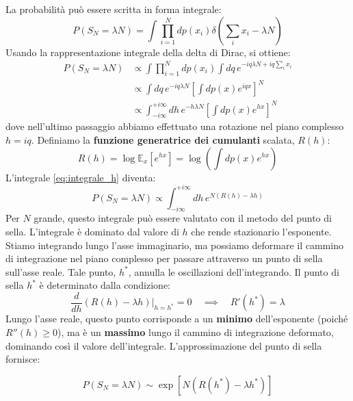 La probabilità può essere scritta in forma integrale:
\begin{equation}
P(S_N = \lambda N) = \int \prod_{i=1}^N dp(x_i) \delta\left(\sum_i x_i - \lambda N\right)
\end{equation}
Usando la rappresentazione integrale della delta di Dirac, si ottiene:
\begin{align}
 P(S_N = \lambda N) &\propto \int \prod_{i=1}^N dp(x_i) \int dq \, e^{-iq\lambda N + iq \sum_i x_i}  \\ &\propto \int dq \, e^{-iq\lambda N} \left[\int dp(x) e^{iqx}\right]^N \\
 \label{eq:integrale_h}
 &\propto \int_{-i\infty}^{+i\infty} dh \, e^{-h\lambda N} \left[\int dp(x) e^{hx}\right]^N
\end{align}
dove nell'ultimo passaggio abbiamo effettuato una rotazione nel piano complesso $h=iq$.
Definiamo la \textbf{funzione generatrice dei cumulanti} scalata, $R(h)$:
\begin{equation}
 R(h) = \log \mathbb{E}_x[e^{hx}] = \log\left(\int dp(x) e^{hx}\right)
\end{equation}
L'integrale \eqref{eq:integrale_h} diventa:
\begin{equation}
 P(S_N = \lambda N) \propto \int_{-i\infty}^{+i\infty} dh \, e^{N\left(R(h) - \lambda h\right)}
\end{equation}
Per $N$ grande, questo integrale può essere valutato con il metodo del punto di sella. L'integrale è dominato dal valore di $h$ che rende stazionario l'esponente. Stiamo integrando lungo l'asse immaginario, ma possiamo deformare il cammino di integrazione nel piano complesso per passare attraverso un punto di sella sull'asse reale. Tale punto, $h^*$, annulla le oscillazioni dell'integrando. Il punto di sella $h^*$ è determinato dalla condizione:
\begin{equation}
 \frac{d}{dh} (R(h) - \lambda h)\bigg|_{h=h^*} = 0 \quad \implies \quad R'(h^*) = \lambda
\end{equation}
Lungo l'asse reale, questo punto corrisponde a un \textbf{minimo} dell'esponente (poiché \mbox{$R''(h) \ge 0$}), ma è un \textbf{massimo} lungo il cammino di integrazione deformato, dominando così il valore dell'integrale.
L'approssimazione del punto di sella fornisce:

\begin{tcolorbox}[colback=yellow!30,  
                  colframe=yellow!50!orange,  
                  boxrule=0.8pt, 
                  arc=3pt,  
                  top=4pt, bottom=4pt, left=6pt, right=6pt,
                  enhanced,
                  sharp corners=south]
\begin{equation}
 P(S_N = \lambda N) \sim \exp\left[N(R(h^*) - \lambda h^*)\right]
\end{equation}
\end{tcolorbox}


